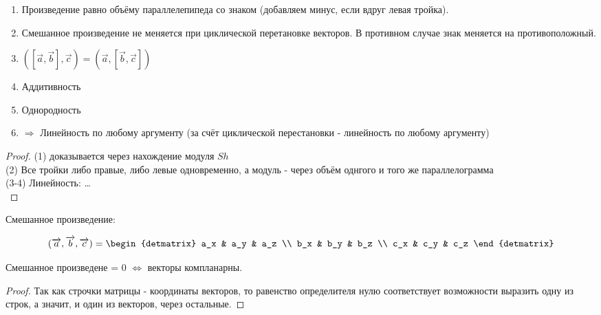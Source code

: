 \documentclass[12pt, a4paper]{article}
\begin{document}
    \begin{property}
        \begin{enumerate}
            \item Произведение равно объёму параллелепипеда со знаком (добавляем минус, если вдруг левая тройка).
            \item Смешанное произведение не меняется при циклической перетановке векторов. 
            В противном случае знак меняется на противоположный.
            \item $([\vec{a}, \vec{b}], \vec{c}) = (\vec{a}, [\vec{b}, \vec{c}])$
            \item Аддитивность
            \item Однородность
            \item $\Rightarrow$ Линейность по любому аргументу (за счёт циклической перестановки - линейность по любому аргументу)
        \end{enumerate}
    \end{property}
    \begin{proof} \nl
        (1) доказывается через нахождение модуля $Sh$ \\
        (2) Все тройки либо правые, либо левые одновременно, а модуль - через объём однгого и того же параллелограмма \\
        (3-4) Линейность: \dots \\
    \end{proof}


    \begin{theorem}
        Смешанное произведение:

        \begin{equation}
            (\vec{a}, \vec{b}, \vec{c}) = \begin{detmatrix}
                a_x & a_y & a_z \\
                b_x & b_y & b_z \\
                c_x & c_y & c_z
            \end{detmatrix}
        \end{equation}
    \end{theorem}

    \begin{theorem}
        Смешанное произведене = 0 $\Leftrightarrow$ векторы компланарны.
    \end{theorem}
    \begin{proof}
        Так как строчки матрицы - координаты векторов, 
        то равенство определителя нулю соответствует возможности выразить одну из строк, 
        а значит, и один из векторов, через остальные.
    \end{proof}
\end{document}
